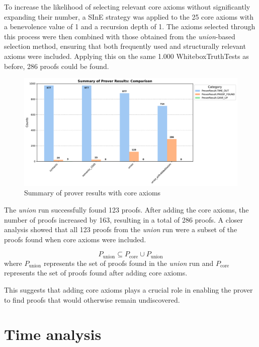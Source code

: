 \documentclass[english,version-2020-11]{uzl-thesis}
\begin{document}
To increase the likelihood of selecting relevant core axioms without significantly expanding their number, a SInE strategy was applied to the 25 core axioms with a benevolence value of 1 and a recursion depth of 1. The axioms selected through this process were then combined with those obtained from the \textit{union}-based selection method, ensuring that both frequently used and structurally relevant axioms were included. Applying this on the same 1.000 WhiteboxTruthTests as before, 286 proofs could be found.

\begin{figure}[h!]
    \centering
    \includegraphics[width=\textwidth]{standard_mode_output.pdf}
    \caption{Summary of prover results with core axioms}
    \label{fig:prover_results_with_core_axioms}
\end{figure}
\FloatBarrier

The \textit{union} run successfully found 123 proofs. After adding the core axioms, the number of proofs increased by 163, resulting in a total of 286 proofs. A closer analysis showed that all 123 proofs from the \textit{union} run were a subset of the proofs found when core axioms were included. 

\begin{equation}
    P_{\text{union}} \subseteq P_{\text{core}} \cup P_{\text{union}}
\end{equation}
where \( P_{\text{union}} \) represents the set of proofs found in the \textit{union} run and \( P_{\text{core}} \) represents the set of proofs found after adding core axioms.


This suggests that adding core axioms plays a crucial role in enabling the prover to find proofs that would otherwise remain undiscovered.

\section{Time analysis}
\end{document}
